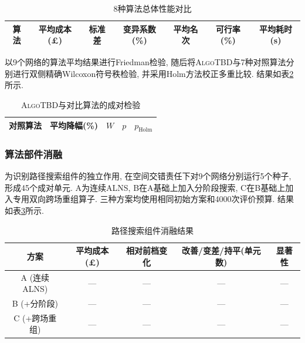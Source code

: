 \documentclass{setp-new}
\newcommand{\setptabsetup}{\fontsize{9pt}{10.5pt}\selectfont\renewcommand{\arraystretch}{0.90}\setlength{\tabcolsep}{2.2pt}\setlength{\aboverulesep}{0.4pt}\setlength{\belowrulesep}{0.4pt}\hbadness=10000}
\begin{document}
\begin{table}[H]
\centering
\caption{8种算法总体性能对比}
\label{tab:algorithm-summary}
\setptabsetup
\begin{tabular}{@{}ccccccc@{}}
\toprule
算法 & 平均成本(£) & 标准差 & 变异系数(\%) & 平均名次 & 可行率(\%) & 平均耗时(s)\\
\midrule
\bottomrule
\end{tabular}
\end{table}

以9个网络的算法平均结果进行Friedman检验,
随后将\textsc{AlgoTBD}与7种对照算法分别进行双侧精确Wilcoxon符号秩检验,
并采用Holm方法校正多重比较.
结果如表\ref{tab:pairwise-tests}所示.

\begin{table}[H]
\centering
\caption{\textsc{AlgoTBD}与对比算法的成对检验}
\label{tab:pairwise-tests}
\setptabsetup
\begin{tabular}{@{}ccccc@{}}
\toprule
对照算法 & 平均降幅(\%) & $W$ & $p$ & $p_{\mathrm{Holm}}$\\
\midrule
\bottomrule
\end{tabular}
\end{table}

\subsubsection{算法部件消融}

为识别路径搜索组件的独立作用,
在空间交错责任下对9个网络分别运行5个种子, 形成45个成对单元.
A为连续ALNS, B在A基础上加入分阶段搜索, C在B基础上加入专用双向跨场重组算子.
三种方案均使用相同初始方案和4000次评价预算.
结果如表\ref{tab:component-ablation}所示.

\begin{table}[H]
\centering
\caption{路径搜索组件消融结果}
\label{tab:component-ablation}
\setptabsetup
\begin{tabular}{@{}ccccc@{}}
\toprule
方案 & 平均成本(£) & 相对前档变化 & 改善/变差/持平(单元数) & 显著性\\
\midrule
A (连续ALNS)      & --- & --- & --- & ---\\
B (+分阶段)        & --- & --- & --- & ---\\
C (+跨场重组)      & --- & --- & --- & ---\\
\bottomrule
\end{tabular}
\end{table}
\end{document}
